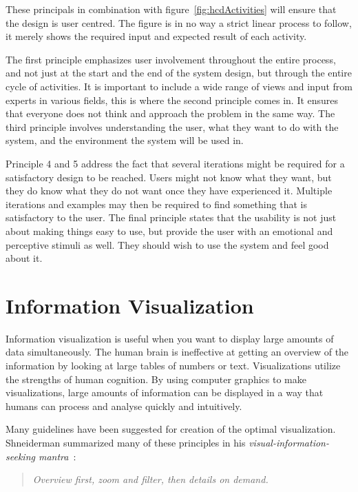These principals in combination with figure~\ref{fig:hcdActivities} will ensure that the design is user centred. The figure is in no way a strict linear process to follow, it merely shows the required input and expected result of each activity.

The first principle emphasizes user involvement throughout the entire process, and not just at the start and the end of the system design, but through the entire cycle of activities. It is important to include a wide range of views and input from experts in various fields, this is where the second principle comes in. It ensures that everyone does not think and approach the problem in the same way. The third principle involves understanding the user, what they want to do with the system, and the environment the system will be used in.

Principle 4 and 5 address the fact that several iterations might be required for a satisfactory design to be reached. Users might not know what they want, but they do know what they do not want once they have experienced it. Multiple iterations and examples may then be required to find something that is satisfactory to the user. The final principle states that the usability is not just about making things easy to use, but provide the user with an emotional and perceptive stimuli as well. They should wish to use the system and feel good about it.

\section{Information Visualization}
Information visualization is useful when you want to display large amounts of data simultaneously. The human brain is ineffective at getting an overview of the information by looking at large tables of numbers or text. Visualizations utilize the strengths of human cognition. By using computer graphics to make visualizations, large amounts of information can be displayed in a way that humans can process and analyse quickly and intuitively.

Many guidelines have been suggested for creation of the optimal visualization. Shneiderman summarized many of these principles in his \emph{visual-information-seeking mantra}~\cite{shneiderman}:

\vspace{-13pt}
\begin{quote}
\textit{Overview first, zoom and filter, then details on demand.}
\end{quote}

